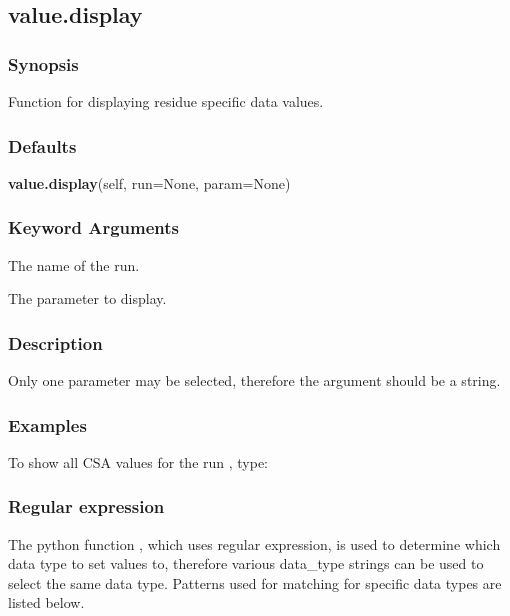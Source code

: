   

 \newpage 

 \subsection{value.display} 

  
 \subsubsection{Synopsis} 

 Function for displaying residue specific data values. 
  

  
 \subsubsection{Defaults} 

 \textsf{\textbf{value.display}(self, run=None, param=None)} 

  
 \subsubsection{Keyword Arguments} 

   The name of the run.   

   The parameter to display.  

  

  
 \subsubsection{Description} 

 Only one parameter may be selected, therefore the  argument should be a string. 
  

  
 \subsubsection{Examples} 

 To show all CSA values for the run , type: 
  


  
 \subsubsection{Regular expression} 

 The python function , which uses regular expression, is used to determine which data type to set values to, therefore various data\_type strings can be used to select the same data type.  Patterns used for matching for specific data types are listed below. 
  

